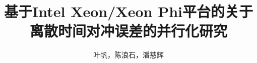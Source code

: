 




\title{基于Intel Xeon/Xeon Phi平台的关于离散时间对冲误差的并行化研究}
\author{叶帆，陈浪石，潘慈辉}
\maketitle



















